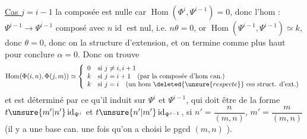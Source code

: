 \uline{Cas $j=i-1$}
la composée
est nulle car $\operatorname{Hom}(\Phi^i,\Psi^{i-1})=0$,
donc l'hom
:
$\Psi^{i-1}\longrightarrow\Psi^{i-1}$
composé avec $n\operatorname{id}$ est nul, i.e.
$n\theta=0$, or $\operatorname{Hom}(\Psi^{i-1},\Psi^{i-1})\simeq k$, donc
$\theta=0$, donc on  la structure
d'extension, et on termine comme
plus haut pour conclure
$\alpha=0$. Donc on trouve
\[
\operatorname{Hom}(\Phi(i,n),\Phi(j,m))\simeq
\left\{\begin{array}{ll}
0&\text{si }j\neq i,i+1\\
k&\text{si }j=i+1\quad\text{(par la composée d'hom can.)}\\
k&\text{si }j=i\quad\text{(un hom }\deleted{\unsure{respecte}}\text{ ces struct. d'ext.)}
\end{array}\right.
\]
et est déterminé par ce qu'il induit
sur $\Psi^i$ et $\Psi^{i-1}$, qui doit être de
la forme $t\unsure{m'|n'}\operatorname{id}_{\Psi^i}$ et $t\unsure{n'|m'}\operatorname{id}_{\Psi^{i-1}}$,
si $n'=\dfrac{n}{(m,n)}$, $m'=\dfrac{m}{(m,n)}$ (il y a
une base can. une fois qu'on a
choisi le pgcd $(m,n)$ ).
